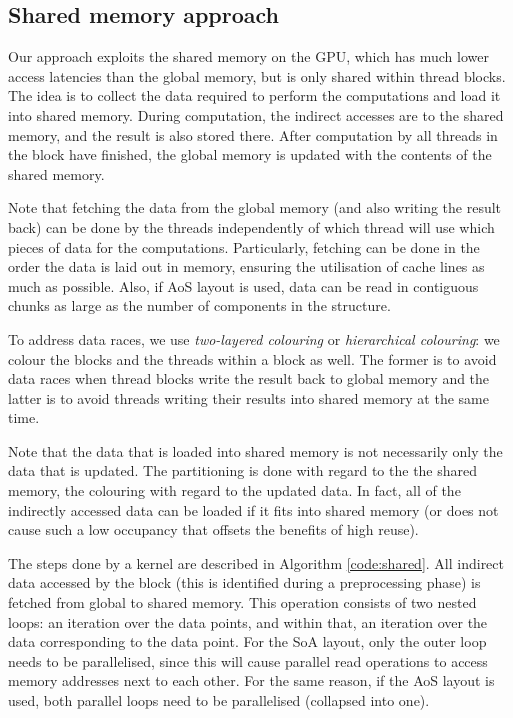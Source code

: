 \subsection{Shared memory approach}\label{shared-memory-approach}

Our approach exploits the shared memory on the GPU, which has much lower access
latencies than the global memory, but is only shared within thread blocks. The
idea is to collect the data required to perform the computations and load it
into shared memory. During computation, the indirect accesses are to the shared
memory, and the result is also stored there. After computation by all threads
in the block have finished, the global memory is updated with the contents of
the shared memory.

Note that fetching the data from the global memory (and also writing the result
back) can be done by the threads independently of which thread will use which
pieces of data for the computations. Particularly, fetching can be done in the
order the data is laid out in memory, ensuring the utilisation of cache lines as
much as possible. Also, if AoS layout is used, data can be read in contiguous
chunks as large as the number of components in the structure.

To address data races, we use \emph{two-layered colouring} or \emph{hierarchical
colouring}\cite{op2}: we colour the blocks and the threads within a block as
well. The former is to avoid data races when thread blocks write the result back
to global memory and the latter is to avoid threads writing their results into
shared memory at the same time.

Note that the data that is loaded into shared memory is not necessarily only the
data that is updated. The partitioning is done with regard to the the shared
memory, the colouring with regard to the updated data. In fact, all of the
indirectly accessed data can be loaded if it fits into shared memory (or does
not cause such a low occupancy that offsets the benefits of high reuse).

The steps done by a kernel are described in Algorithm \ref{code:shared}. All
indirect data accessed by the block (this is identified during a preprocessing
phase) is fetched from global to shared memory. This operation consists of two
nested loops: an iteration over the data points, and within that, an iteration
over the data corresponding to the data point. For the SoA layout, only the
outer loop needs to be parallelised, since this will cause parallel read
operations to access memory addresses next to each other. For the same reason,
if the AoS layout is used, both parallel loops need to be parallelised
(collapsed into one).

